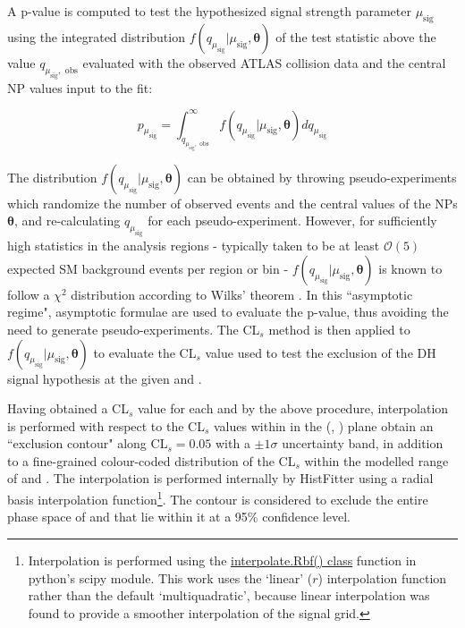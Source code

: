 A p-value is computed to test the hypothesized signal strength parameter \(\mu_\text{sig}\) using the integrated distribution \(f(q_{\mu_\text{sig}}|\mu_\text{sig}, \boldsymbol{\theta})\) of the test statistic above the value \(q_{\mu_\text{sig},\text{ obs}}\) evaluated with the observed ATLAS collision data and the central NP values input to the fit:

\begin{equation}
\label{eq:pvalue}
p_{\mu_\text{sig}} = \int_{q_{\mu_\text{sig},\text{ obs}}}^\infty f(q_{\mu_\text{sig}}|\mu_\text{sig}, \boldsymbol{\theta})dq_{\mu_\text{sig}}
\end{equation}

The distribution \(f(q_{\mu_\text{sig}}|\mu_\text{sig}, \boldsymbol{\theta})\) can be obtained by throwing pseudo-experiments which randomize the number of observed events and the central values of the NPs \(\boldsymbol{\theta}\), and re-calculating \(q_{\mu_\text{sig}}\) for each pseudo-experiment. However, for sufficiently high statistics in the analysis regions - typically taken to be at least \(\mathcal{O}(5)\) expected SM background events per region or bin - \(f(q_{\mu_\text{sig}}|\mu_\text{sig}, \boldsymbol{\theta})\) is known to follow a \(\chi^2\) distribution according to Wilks' theorem \cite{Wilks_1938}. In this ``asymptotic regime", asymptotic formulae \cite{Cowan_2011} are used to evaluate the p-value, thus avoiding the need to generate pseudo-experiments. The CL\(_s\) method \cite{Read_2002} is then applied to \(f(q_{\mu_\text{sig}}|\mu_\text{sig}, \boldsymbol{\theta})\) to evaluate the CL\(_s\) value used to test the exclusion of the DH signal hypothesis at the given \ms and \mZp.

Having obtained a CL\(_s\) value for each \ms and \mZp by the above procedure, interpolation is performed with respect to the CL\(_s\) values within in the (\ms, \mZp) plane obtain an ``exclusion contour" along CL\(_s=0.05\) with a \(\pm1\sigma\) uncertainty band, in addition to a fine-grained colour-coded distribution of the CL\(_s\) within the modelled range of \ms and \mZp. The interpolation is performed internally by HistFitter using a radial basis interpolation function\footnote{Interpolation is performed using the \href{https://docs.scipy.org/doc/scipy/reference/generated/scipy.interpolate.Rbf.html}{interpolate.Rbf() class} function in python's scipy module. This work uses the `linear' (\(r\)) interpolation function rather than the default `multiquadratic', because linear interpolation was found to provide a smoother interpolation of the signal grid.}. The contour is considered to exclude the entire phase space of \ms and \mZp that lie within it at a 95\% confidence level.


